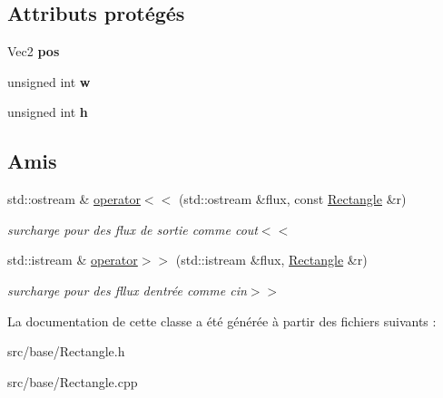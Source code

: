 \subsection*{Attributs protégés}
\begin{DoxyCompactItemize}
\item 
\mbox{\label{class_rectangle_a77b408f42c985329c92cf4017c0cccbf}} 
Vec2 {\bfseries pos}
\item 
\mbox{\label{class_rectangle_acd28f1ca4b37a5563ca04900a04e6a61}} 
unsigned int {\bfseries w}
\item 
\mbox{\label{class_rectangle_a1f6826771367cf8bbc891002879af25a}} 
unsigned int {\bfseries h}
\end{DoxyCompactItemize}
\subsection*{Amis}
\begin{DoxyCompactItemize}
\item 
\mbox{\label{class_rectangle_a4ad36cfac2439cc552d60271d657b756}} 
std\+::ostream \& \mbox{\hyperlink{class_rectangle_a4ad36cfac2439cc552d60271d657b756}{operator$<$$<$}} (std\+::ostream \&flux, const \mbox{\hyperlink{class_rectangle}{Rectangle}} \&r)
\begin{DoxyCompactList}\small\item\em surcharge pour des flux de sortie comme cout$<$$<$ \end{DoxyCompactList}\item 
\mbox{\label{class_rectangle_ac8aa7e7afae9a4ff96c594710019e9f5}} 
std\+::istream \& \mbox{\hyperlink{class_rectangle_ac8aa7e7afae9a4ff96c594710019e9f5}{operator$>$$>$}} (std\+::istream \&flux, \mbox{\hyperlink{class_rectangle}{Rectangle}} \&r)
\begin{DoxyCompactList}\small\item\em surcharge pour des fllux d\textquotesingle{}entrée comme cin$>$$>$ \end{DoxyCompactList}\end{DoxyCompactItemize}


La documentation de cette classe a été générée à partir des fichiers suivants \+:\begin{DoxyCompactItemize}
\item 
src/base/Rectangle.\+h\item 
src/base/Rectangle.\+cpp\end{DoxyCompactItemize}
